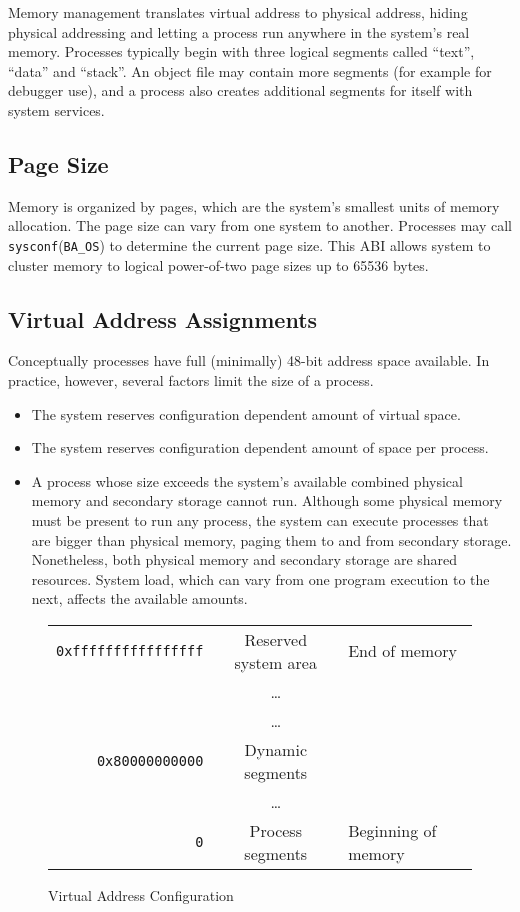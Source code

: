 Memory management translates virtual address to physical address,
hiding physical addressing and letting a process run anywhere in the
system's real memory. Processes typically begin with three logical
segments called ``text'', ``data'' and ``stack''. An object file may
contain more segments (for example for debugger use), and a process
also creates additional segments for itself with system services.

\subsection{Page Size}

Memory is organized by pages, which are the system's smallest units of
memory allocation. The page size can vary from one system to another.
Processes may call \verb|sysconf|(\verb|BA_OS|) to determine the
current page size.  This ABI allows system to cluster memory to
logical power-of-two page sizes up to 65536 bytes.

\subsection{Virtual Address Assignments}
Conceptually processes have full (minimally) 48-bit address space available.
In practice, however, several factors limit the size of a process.
\begin{itemize}
  \item The system reserves configuration dependent amount of virtual space.
  \item The system reserves configuration dependent amount of space per
    process.
  \item
    A process whose size exceeds the system's available combined physical
    memory and secondary storage cannot run. Although some physical memory
    must be present to run any process, the system can execute processes that
    are bigger than physical memory, paging them to and from secondary storage.
    Nonetheless, both physical memory and secondary storage are
    shared resources. System load, which can vary from one program execution
    to the next, affects the available amounts.
\end{itemize}

\begin{figure}[H]
\Hrule
  \caption{Virtual Address Configuration}
  \label{fig-address}
  \begin{center}
    \begin{tabular}{r|c|l}
      \noalign{\smallskip}  \cline{2-2}
      \verb|0xffffffffffffffff| & Reserved system area & End of memory\\ 
      & \dots & \\ \cline{2-2}
      & \dots & \\
      \verb|0x80000000000| & Dynamic segments & \\ \cline{2-2}
      & \dots & \\
      \verb|0| & Process segments & Beginning of memory\\ \cline{2-2}
    \end{tabular}
  \end{center}
\Hrule
\end{figure}

